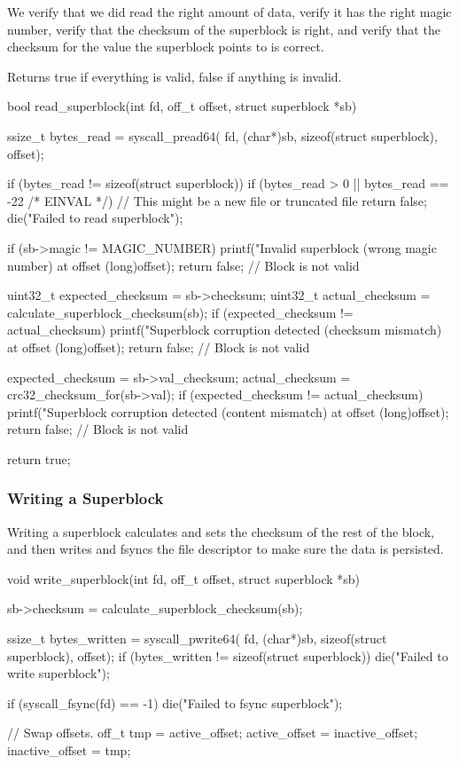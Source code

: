 We verify that we did read the right amount of data, verify it has the right
magic number, verify that the checksum of the superblock is right, and verify
that the checksum for the value the superblock points to is correct.

Returns true if everything is valid, false if anything is invalid.

\begin{clang}
bool read_superblock(int fd, off_t offset, struct superblock *sb) {
  ssize_t bytes_read = syscall_pread64(
      fd, (char*)sb, sizeof(struct superblock), offset);

  if (bytes_read != sizeof(struct superblock)) {
    if (bytes_read > 0 || bytes_read == -22 /* EINVAL */) {
      // This might be a new file or truncated file
      return false;
    }
    die("Failed to read superblock");
  }

  if (sb->magic != MAGIC_NUMBER) {
    printf("Invalid superblock (wrong magic number) at offset %
           (long)offset);
    return false;  // Block is not valid
  }

  uint32_t expected_checksum = sb->checksum;
  uint32_t actual_checksum = calculate_superblock_checksum(sb);
  if (expected_checksum != actual_checksum) {
    printf("Superblock corruption detected (checksum mismatch) at offset %
           (long)offset);
    return false;  // Block is not valid
  }

  expected_checksum = sb->val_checksum;
  actual_checksum = crc32_checksum_for(sb->val);
  if (expected_checksum != actual_checksum) {
    printf("Superblock corruption detected (content mismatch) at offset %
           (long)offset);
    return false;  // Block is not valid
  }

  return true;
}
\end{clang}

\subsubsection{Writing a Superblock}

Writing a superblock calculates and sets the checksum of the rest of the block,
and then writes and fsyncs the file descriptor to make sure the data is
persisted.

\begin{clang}
void write_superblock(int fd, off_t offset, struct superblock *sb) {
    sb->checksum = calculate_superblock_checksum(sb);

    ssize_t bytes_written = syscall_pwrite64(
        fd, (char*)sb, sizeof(struct superblock), offset);
    if (bytes_written != sizeof(struct superblock)) {
      die("Failed to write superblock");
    }

    if (syscall_fsync(fd) == -1) {
      die("Failed to fsync superblock");
    }

    // Swap offsets.
    off_t tmp = active_offset;
    active_offset = inactive_offset;
    inactive_offset = tmp;
}
\end{clang}

